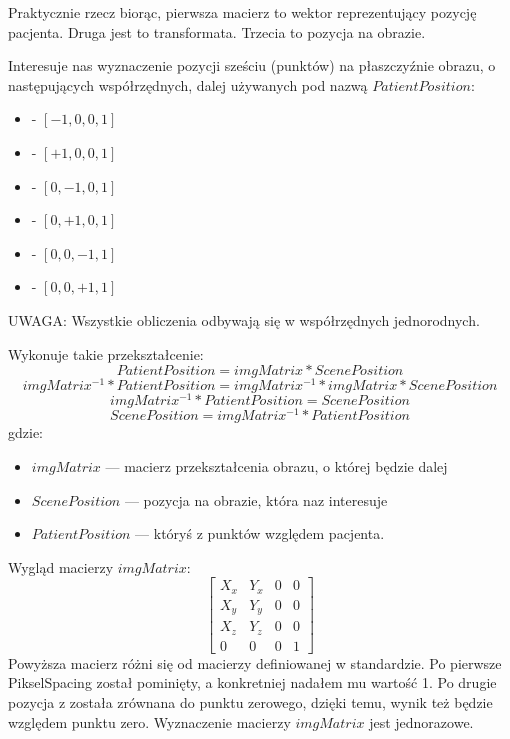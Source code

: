 Praktycznie rzecz biorąc, pierwsza macierz to wektor reprezentujący pozycję pacjenta.
Druga jest to transformata.
Trzecia to pozycja na obrazie.

Interesuje nas wyznaczenie pozycji sześciu (punktów) na płaszczyźnie obrazu, o następujących współrzędnych, dalej używanych pod nazwą $PatientPosition$:
\begin{itemize}
    \item {} - $[-1, 0, 0, 1]$
    \item {} - $[+1, 0, 0, 1]$
    \item {} - $[0, -1, 0, 1]$
    \item {} - $[0, +1, 0, 1]$
    \item {} - $[0, 0, -1, 1]$
    \item {} - $[0, 0, +1, 1]$
\end{itemize}

UWAGA: Wszystkie obliczenia odbywają się w współrzędnych jednorodnych.

Wykonuje takie przekształcenie:
\[PatientPosition = imgMatrix * ScenePosition\]
\[imgMatrix^{-1} * PatientPosition = imgMatrix^{-1} * imgMatrix * ScenePosition\]
\[imgMatrix^{-1} * PatientPosition = ScenePosition\]
\[ScenePosition = imgMatrix^{-1} * PatientPosition\]
gdzie:
\begin{itemize}
    \item $imgMatrix$ --- macierz przekształcenia obrazu, o której będzie dalej
    \item $ScenePosition$ --- pozycja na obrazie, która naz interesuje
    \item $PatientPosition$ --- któryś z punktów względem pacjenta.
\end{itemize}

Wygląd macierzy $imgMatrix$:
\[
    \begin{bmatrix}
        X_x & Y_x & 0 & 0 \\
        X_y & Y_y & 0 & 0 \\
        X_z & Y_z & 0 & 0 \\
        0   & 0   & 0 & 1
    \end{bmatrix}
\]
Powyższa macierz różni się od macierzy definiowanej w standardzie.
Po pierwsze PikselSpacing został pominięty, a konkretniej nadałem mu wartość 1.
Po drugie pozycja z  została zrównana do punktu zerowego, dzięki temu, wynik też będzie względem punktu zero.
Wyznaczenie macierzy $imgMatrix$ jest jednorazowe.

